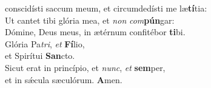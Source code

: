 \evenverse conscidísti saccum meum, et circumdedísti me læ\textbf{tí}tia:\\
\oddverse Ut cantet tibi glória mea, et \textit{non} \textit{com}\textbf{pún}gar:~\*\\
\oddverse Dómine, Deus meus, in ætérnum confitébor \textbf{ti}bi.\\
\evenverse Glória Pa\textit{tri}, \textit{et} \textbf{Fí}lio,~\*\\
\evenverse et Spirítui \textbf{San}cto.\\
\oddverse Sicut erat in princípio, et \textit{nunc}, \textit{et} \textbf{sem}per,~\*\\
\oddverse et in sǽcula sæculórum. \textbf{A}men.\\
